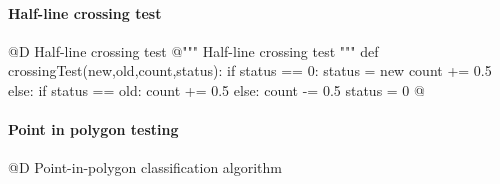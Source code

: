 \documentclass[11pt,oneside]{article}    %
\begin{document}
\paragraph{Half-line crossing test}
@D Half-line crossing test 
@{""" Half-line crossing test """
def crossingTest(new,old,count,status):
    if status == 0:
        status = new
        count += 0.5
    else:
        if status == old: count += 0.5
        else: count -= 0.5
        status = 0
@}

\paragraph{Point in polygon testing}
@D Point-in-polygon classification algorithm
\end{document}
